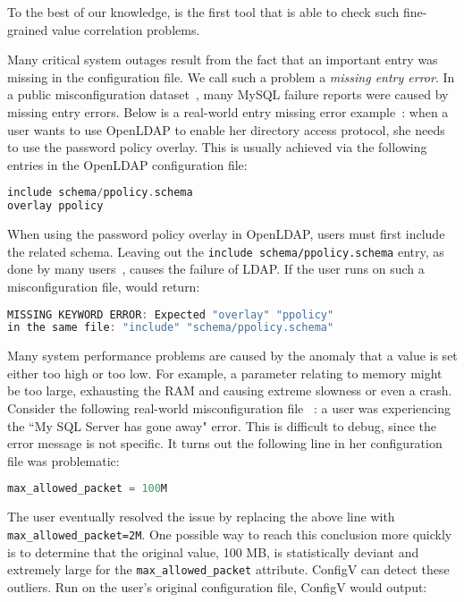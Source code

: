 To the best of our knowledge, \app is the first tool that
is able to check such fine-grained value correlation problems.


Many critical system outages result from the fact that an important
entry was missing in the configuration file. 
We call such a problem a {\em missing entry error}.
In a public misconfiguration dataset~\cite{configdataset},
many MySQL failure reports were caused by
missing entry errors.
Below is a real-world entry missing error example~\cite{yin11anempirical}:
when a user wants to use OpenLDAP to enable her directory access
protocol, she needs to use the password policy overlay. This is usually
achieved via the following entries in the OpenLDAP configuration file:

\begin{lstlisting}[language=C, xleftmargin=.01\textwidth]
include schema/ppolicy.schema
overlay ppolicy
\end{lstlisting} 

When using the password policy overlay in OpenLDAP, 
users must first include the related schema.
Leaving out the {\tt include schema/ppolicy.schema} entry, 
as done by many users~\cite{yin11anempirical}, 
causes the failure of LDAP. 
If the user runs \app on such a misconfiguration file,
\app would return:

\begin{lstlisting}[language=C, xleftmargin=.01\textwidth]
MISSING KEYWORD ERROR: Expected "overlay" "ppolicy"
in the same file: "include" "schema/ppolicy.schema"
\end{lstlisting} 

Many system performance problems are caused by the
anomaly that a value is set either too high or too low.
For example, a parameter relating to memory might be too large,
exhausting the RAM and causing extreme slowness or even a crash. 
Consider the following real-world misconfiguration file%
~\cite{singleValue}: a user was experiencing the ``My SQL Server 
has gone away" error.  
This is difficult to debug, since the error message is not specific.
It turns out the following line in her configuration file was problematic:

\begin{lstlisting}[language=C, xleftmargin=.01\textwidth]
max_allowed_packet = 100M
\end{lstlisting} 

The user eventually resolved the issue by replacing the above line with {\tt max\_allowed\_packet=2M}.
One possible way to reach this conclusion more quickly is to determine that the original value, 100 MB, 
is statistically deviant and extremely large for the {\tt max\_allowed\_packet} attribute. 
ConfigV can detect these
outliers. Run on the user's original configuration file, ConfigV would output:

